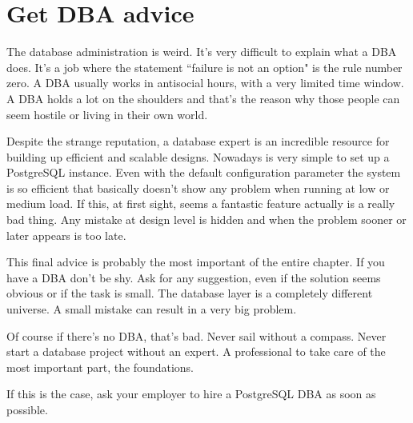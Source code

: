 \section{Get DBA advice}
\label{sec:GETDBA}
The database administration is weird. It's very difficult to explain what a DBA does. It's a job
where the statement ``failure is not an option" is the rule number zero. A DBA usually works in
antisocial hours, with a very limited time window. A DBA holds a lot on the shoulders and that's
the reason why those people can seem hostile or living in their own world.\newline

Despite the strange reputation, a database expert is an incredible resource for building up
efficient and scalable designs. Nowadays is very simple to set up a PostgreSQL instance. Even with
the default configuration parameter the system is so efficient that basically doesn't show any
problem when running at low or medium load. If this, at first sight, seems a fantastic feature
actually is a really bad thing. Any mistake at design level is hidden and when the problem sooner or
later appears is too late.\newline

This final advice is probably the most important of the entire chapter. If you have a DBA don't be
shy. Ask for any suggestion, even if the solution seems obvious or if the task is small. The
database layer is a completely different universe. A small mistake can result in a
very big problem.\newline

Of course if there's no DBA, that's bad. Never sail without a compass. Never start a database
project without an expert. A professional to take care of the most important part, the
foundations.\newline

If this is the case, ask your employer to hire a PostgreSQL DBA as soon as possible.